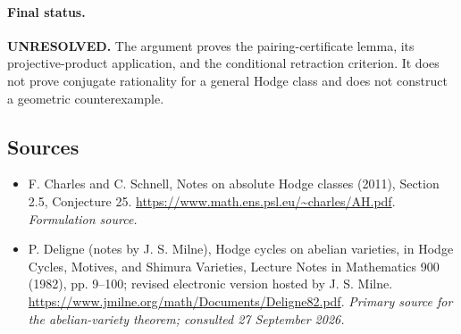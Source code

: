 \documentclass[11pt]{article}
\begin{document}
\paragraph{Final status.}
\textbf{UNRESOLVED.} The argument proves the pairing-certificate lemma,
its projective-product application, and the conditional retraction
criterion. It does not prove conjugate rationality for a general
Hodge class and does not construct a geometric counterexample.

\subsection{Sources}
\begin{itemize}
\item[S1]F. Charles and C. Schnell, Notes on absolute Hodge classes (2011), Section 2.5, Conjecture 25.
\url{https://www.math.ens.psl.eu/~charles/AH.pdf}.
\textit{Formulation source.}
\item[E1]P. Deligne (notes by J. S. Milne), Hodge cycles on abelian varieties, in Hodge Cycles, Motives, and Shimura Varieties, Lecture Notes in Mathematics 900 (1982), pp. 9--100; revised electronic version hosted by J. S. Milne.
\url{https://www.jmilne.org/math/Documents/Deligne82.pdf}.
\textit{Primary source for the abelian-variety theorem; consulted 27 September 2026.}
\end{itemize}
\end{document}
